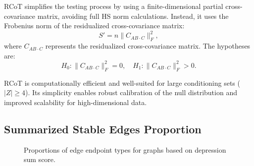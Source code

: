 \documentclass[
]{article}
\begin{document}
RCoT simplifies the testing process by using a finite-dimensional
partial cross-covariance matrix, avoiding full HS norm calculations.
Instead, it uses the Frobenius norm of the residualized cross-covariance
matrix: \[
S' = n \|C_{AB \cdot C}\|_F^2,
\] where \(C_{AB \cdot C}\) represents the residualized cross-covariance
matrix. The hypotheses are: \[
H_0: \|C_{AB \cdot C}\|_F^2 = 0, \quad H_1: \|C_{AB \cdot C}\|_F^2 > 0.
\]

RCoT is computationally efficient and well-suited for large conditioning
sets (\(|Z| \geq 4\)). Its simplicity enables robust calibration of the
null distribution and improved scalability for high-dimensional data.

\subsection{Summarized Stable Edges Proportion}\label{sec-propmatrix}

\begin{figure}


\caption{\label{fig-sum-mat}Proportions of edge endpoint types for
graphs based on depression sum score.}

\end{figure}%
\end{document}
